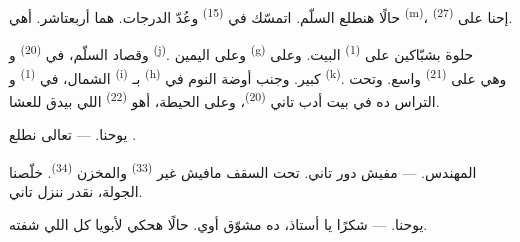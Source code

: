 حالًا هنطلع السلّم. اتمسّك في  \textsuperscript{(15)} وعُدّ الدرجات.
هما أربعتاشر. أهي  \textsuperscript{(m)}، إحنا على 
\textsuperscript{(27)}.

\VUsaut{3.0mm}
\VUsaut{3.0mm}

وقصاد السلّم، في  \textsuperscript{(20)} و
\textsuperscript{(j)}. وعلى اليمين  \textsuperscript{(g)} حلوة بشبّاكين على
 \textsuperscript{(1)} البيت. وعلى الشمال، في 
\textsuperscript{(1)} و \textsuperscript{(i)} بـ
\textsuperscript{(h)} كبير. وجنب أوضة النوم في 
\textsuperscript{(k)}. وهي على  \textsuperscript{(21)} واسع. وتحت التراس ده في
بيت أدب تاني \textsuperscript{(20)}، وعلى الحيطة، أهو 
\textsuperscript{(22)} اللي بيدق للعشا.

\textsc{يوحنا}. --- تعالى نطلع .

\textsc{المهندس}. --- مفيش دور تاني. تحت السقف مافيش غير  \textsuperscript{(33)} والمخزن \textsuperscript{(34)}. خلّصنا الجولة، نقدر
ننزل تاني.

\textsc{يوحنا}. --- شكرًا يا أستاذ، ده مشوّق أوي. حالًا هحكي لأبويا كل اللي
شفته.

\VUsaut{4.0mm}
\VUfilet{22mm}
